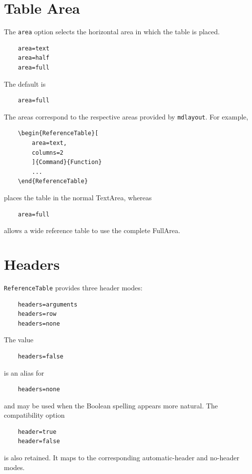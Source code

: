 \documentclass[
11pt,
a4paper,
oneside
]{scrbook}
\begin{document}
{%
\section{Table Area}

The \texttt{area} option selects the horizontal area in which the table is
placed.
\begin{verbatim}
	area=text
	area=half
	area=full
\end{verbatim}
The default is
\begin{verbatim}
	area=full
\end{verbatim}
The areas correspond to the respective areas provided by \texttt{mdlayout}.
For example,
\begin{verbatim}
	\begin{ReferenceTable}[
		area=text,
		columns=2
		]{Command}{Function}
		...
	\end{ReferenceTable}
\end{verbatim}
places the table in the normal TextArea, whereas
\begin{verbatim}
	area=full
\end{verbatim}
allows a wide reference table to use the complete FullArea.

\section{Headers}

\texttt{ReferenceTable} provides three header modes:
\begin{verbatim}
	headers=arguments
	headers=row
	headers=none
\end{verbatim}
The value
\begin{verbatim}
	headers=false
\end{verbatim}
is an alias for
\begin{verbatim}
	headers=none
\end{verbatim}
and may be used when the Boolean spelling appears more natural.
The compatibility option
\begin{verbatim}
	header=true
	header=false
\end{verbatim}
is also retained. It maps to the corresponding automatic-header and
no-header modes.

}
\end{document}

